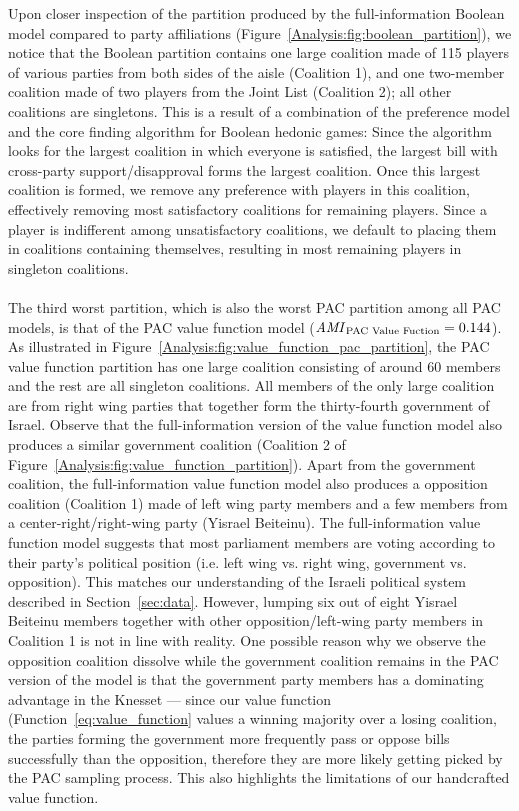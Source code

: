 Upon closer inspection of the partition produced by the full-information Boolean
model compared to party affiliations (Figure~\ref{Analysis:fig:boolean_partition}),
we notice that the Boolean partition contains one large coalition made of 115
players of various parties from both sides of the aisle (Coalition 1),
and one two-member coalition made of two players from the Joint List (Coalition 2);
all other coalitions are singletons.
This is a result of a combination of the preference model and the core finding
algorithm for Boolean hedonic games:
Since the algorithm looks for the largest coalition in which everyone is
satisfied, the largest bill with cross-party support/disapproval forms the
largest coalition.
Once this largest coalition is formed, we remove any preference with players
in this coalition, effectively removing most satisfactory coalitions for
remaining players.
Since a player is indifferent among unsatisfactory coalitions, we default to
placing them in coalitions containing themselves, resulting in most remaining
players in singleton coalitions.

\paragraph{} The third worst partition, which is also the worst PAC partition
among all PAC models, is that of the PAC value function model
($\mathit{AMI}_{\text{PAC Value Fuction}} = 0.144$).
As illustrated in Figure~\ref{Analysis:fig:value_function_pac_partition}, the
PAC value function partition has one large coalition consisting of around 60
members and the rest are all singleton coalitions.
All members of the only large coalition are from right wing parties that
together form the thirty-fourth government of Israel.
Observe that the full-information version of the value function model also
produces a similar government coalition (Coalition 2 of
Figure~\ref{Analysis:fig:value_function_partition}).
Apart from the government coalition, the full-information value function model
also produces a opposition coalition (Coalition 1) made of left wing party
members and a few members from a center-right/right-wing party
(Yisrael Beiteinu).
The full-information value function model suggests that most parliament members
are voting according to their party's political position (i.e. left wing vs.
right wing, government vs. opposition).
This matches our understanding of the Israeli political system described in
Section~\ref{sec:data}.
However, lumping six out of eight Yisrael Beiteinu members together with other
opposition/left-wing party members in Coalition 1 is not in line with reality.
One possible reason why we observe the opposition coalition dissolve while the
government coalition remains in the PAC version of the model is that the
government party members has a dominating advantage in the Knesset --- since our
value function (Function~\ref{eq:value_function} values a winning majority over
a losing coalition, the parties forming the government more frequently pass
or oppose bills successfully than the opposition, therefore they are more
likely getting picked by the PAC sampling process.
This also highlights the limitations of our handcrafted value function.

